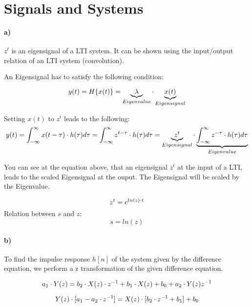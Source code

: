 \section{Signals and Systems} 

\paragraph{a)}

$z^t$ is an eigensignal of a LTI system. It can be shown using the input/output relation of an
LTI system (convolution).

An Eigensignal has to satisfy the following condition:

\begin{equation}
 y(t) = H\{x(t)\} = \underbrace{\lambda}_{Eigenvalue} \cdot \underbrace{x(t)}_{Eigensignal}
\end{equation}

Setting $x(t)$ to $z^t$ leads to the following:
\begin{equation}
 y(t) = \int_{-\infty}^{\infty} x(t-\tau ) \cdot h(\tau ) d \tau = 
 \int_{-\infty}^{\infty} z^{t-\tau} \cdot h(\tau ) d \tau = 
 \underbrace{z^t}_{Eigensignal} \cdot \underbrace{ \int_{-\infty}^{\infty} z^{-\tau} \cdot h(\tau ) d \tau }_{Eigenvalue}
\end{equation}

You can see at the equation above, that an eigensignal $z^t$ at the input of a LTI, leads
to the scaled Eigensignal at the ouput. The Eigensignal will be scaled by the Eigenvalue.


\begin{equation}
 z^t = e^{ln(z) \cdot t}
\end{equation}
Relation between $s$ and $z$:
\begin{equation}
 s = ln(z)
\end{equation}


\paragraph{b)}
To find the impulse response $h[n]$ of the system given by the difference equation, we perform
a z transformation of the given difference equation.

\begin{equation}
 a_1 \cdot Y(z) = b_2 \cdot X(z) \cdot z^{-1} + b_1 \cdot X(z) + b_0 + a_2 \cdot Y(z) z^{-1}
\end{equation}

\begin{equation}
Y(z) \cdot [a_1 - a_2 \cdot z^{-1}]= X(z) \cdot [b_2 \cdot z^{-1} + b_1] + b_0
\label{eq:sysz}
\end{equation}


